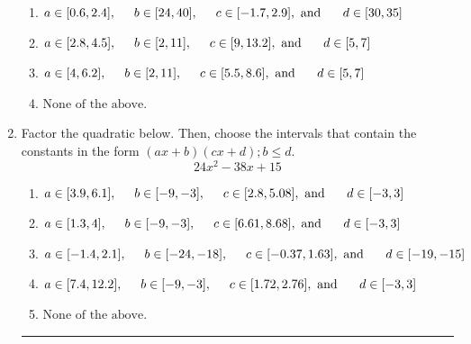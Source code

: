 \documentclass[14pt]{extbook}
\newcommand{\litem}[1]{\item#1\hspace*{-1cm}\rule{\textwidth}{0.4pt}}
\begin{document}
\begin{enumerate}
{\begin{enumerate}[label=\Alph*.]
\item \( a \in [0.6, 2.4], \hspace*{5mm} b \in [24, 40], \hspace*{5mm} c \in [-1.7, 2.9], \text{ and } \hspace*{5mm} d \in [30, 35] \)
\item \( a \in [2.8, 4.5], \hspace*{5mm} b \in [2, 11], \hspace*{5mm} c \in [9, 13.2], \text{ and } \hspace*{5mm} d \in [5, 7] \)
\item \( a \in [4, 6.2], \hspace*{5mm} b \in [2, 11], \hspace*{5mm} c \in [5.5, 8.6], \text{ and } \hspace*{5mm} d \in [5, 7] \)
\item \( \text{None of the above.} \)

\end{enumerate} }
\litem{
Factor the quadratic below. Then, choose the intervals that contain the constants in the form $(ax+b)(cx+d); b \leq d.$\[ 24x^{2} -38 x + 15 \]\begin{enumerate}[label=\Alph*.]
\item \( a \in [3.9, 6.1], \hspace*{5mm} b \in [-9, -3], \hspace*{5mm} c \in [2.8, 5.08], \text{ and } \hspace*{5mm} d \in [-3, 3] \)
\item \( a \in [1.3, 4], \hspace*{5mm} b \in [-9, -3], \hspace*{5mm} c \in [6.61, 8.68], \text{ and } \hspace*{5mm} d \in [-3, 3] \)
\item \( a \in [-1.4, 2.1], \hspace*{5mm} b \in [-24, -18], \hspace*{5mm} c \in [-0.37, 1.63], \text{ and } \hspace*{5mm} d \in [-19, -15] \)
\item \( a \in [7.4, 12.2], \hspace*{5mm} b \in [-9, -3], \hspace*{5mm} c \in [1.72, 2.76], \text{ and } \hspace*{5mm} d \in [-3, 3] \)
\item \( \text{None of the above.} \)


\end{enumerate}}
\end{enumerate}
\end{document}
